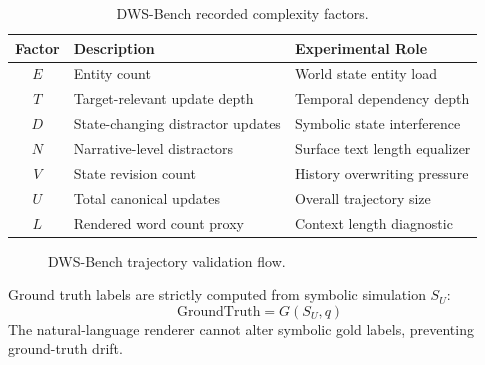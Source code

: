 \documentclass{iutbscthesis}
\begin{document}
\begin{table}[H]
\centering
\small
\renewcommand{\arraystretch}{1.2}
\begin{tabular}{c p{} p{}}
\toprule
\textbf{Factor} & \textbf{Description} & \textbf{Experimental Role} \\
\midrule
$E$ & Entity count & World state entity load \\
$T$ & Target-relevant update depth & Temporal dependency depth \\
$D$ & State-changing distractor updates & Symbolic state interference \\
$N$ & Narrative-level distractors & Surface text length equalizer \\
$V$ & State revision count & History overwriting pressure \\
$U$ & Total canonical updates & Overall trajectory size \\
$L$ & Rendered word count proxy & Context length diagnostic \\
\bottomrule
\end{tabular}
\caption{DWS-Bench recorded complexity factors.}
\label{tab:experimental-contract}
\end{table}

\begin{figure}[H]
\centering
{}
\caption{DWS-Bench trajectory validation flow.}
\label{fig:validation-flow}
\end{figure}

Ground truth labels are strictly computed from symbolic simulation $S_U$:
\begin{equation}
\mathrm{GroundTruth} = G(S_U, q)
\end{equation}
The natural-language renderer cannot alter symbolic gold labels, preventing ground-truth drift.
\end{document}
